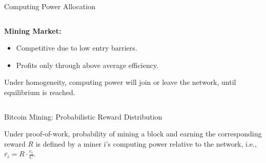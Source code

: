 \documentclass[handout]{beamer}
\begin{document}
\begin{frame}{Computing Power Allocation}

\begin{columns}[T]
	\begin{column}{0.45\textwidth}
		\textbf{Mining Market:} \\
		\begin{itemize}
			\item Competitive due to low entry barriers.
			\item Profits only through above average efficiency.
		\end{itemize}		
		Under homogeneity, computing power will join or leave the network, until equilibrium is reached.
		
		\vspace{1 em}
		
		\vspace{1 em}
	\end{column} %
	\begin{column}{0.55\textwidth}
		\begin{center}
		\begin{tikzpicture}[scale=1.0, every node/.style ={scale=1.0}]
			
		\end{tikzpicture}
		\end{center}
	\end{column}
\end{columns}

	
\end{frame}

\begin{frame}{Bitcoin Mining: Probabilistic Reward Distribution}

Under proof-of-work, probability of mining a block and earning the corresponding reward $R$ is defined by a miner i's computing power relative to the network, i.e., $\overline{r_{i}} = R  \cdot \frac{c_{i}}{C}$.

\vspace{1.5 em}

\end{frame}
\end{document}
